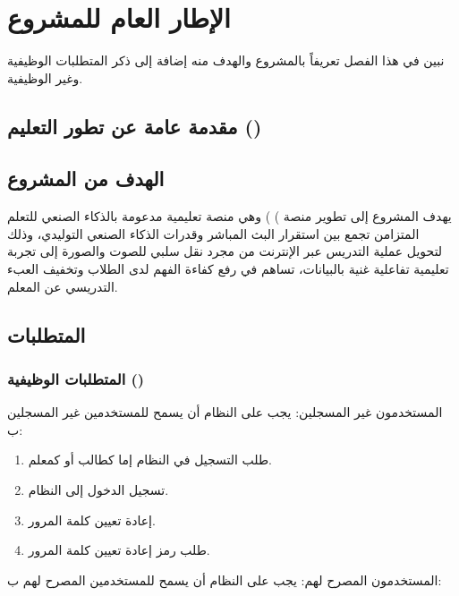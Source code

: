 \chapter{الإطار العام للمشروع}

\begin{chaptersummary}
نبين في هذا الفصل تعريفاً بالمشروع والهدف منه إضافة إلى ذكر المتطلبات الوظيفية وغير الوظيفية.
\end{chaptersummary}

\section{مقدمة عامة عن تطور التعليم ()}

\section{الهدف من المشروع}

يهدف المشروع إلى تطوير منصة ) ) وهي منصة تعليمية مدعومة بالذكاء الصنعي للتعلم المتزامن تجمع بين استقرار البث المباشر وقدرات الذكاء الصنعي التوليدي، وذلك لتحويل عملية التدريس عبر الإنترنت من مجرد نقل سلبي للصوت والصورة إلى تجربة تعليمية تفاعلية غنية بالبيانات، تساهم في رفع كفاءة الفهم لدى الطلاب وتخفيف العبء التدريسي عن المعلم.

\section{المتطلبات}

\subsection{المتطلبات الوظيفية ()}

\noindent المستخدمون غير المسجلين: يجب على النظام أن يسمح للمستخدمين غير المسجلين ب:

\begin{enumerate}
  \item طلب التسجيل في النظام إما كطالب أو كمعلم.
  \item تسجيل الدخول إلى النظام.
  \item إعادة تعيين كلمة المرور.
  \item طلب رمز إعادة تعيين كلمة المرور.
\end{enumerate}

\noindent المستخدمون المصرح لهم: يجب على النظام أن يسمح للمستخدمين المصرح لهم ب:

